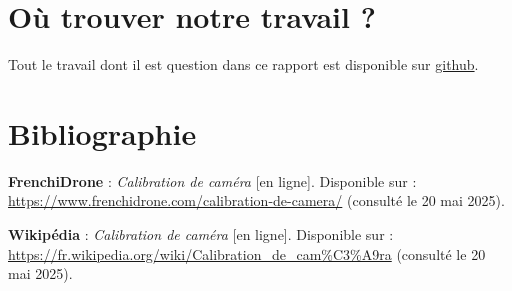 \documentclass[12pt]{article}
\begin{document}
\newpage

\section{Où trouver notre travail ?}

Tout le travail dont il est question dans ce rapport est disponible sur \href{https://github.com/antoinedenovembre/3d_reconstruction}{github}.

\newpage

\section{Bibliographie}

\noindent \textbf{FrenchiDrone} : \textit{Calibration de caméra} [en ligne]. Disponible sur : \url{https://www.frenchidrone.com/calibration-de-camera/} (consulté le 20 mai 2025).

\noindent \textbf{Wikipédia} : \textit{Calibration de caméra} [en ligne]. Disponible sur : \url{https://fr.wikipedia.org/wiki/Calibration_de_cam%C3%A9ra} (consulté le 20 mai 2025).
\end{document}
